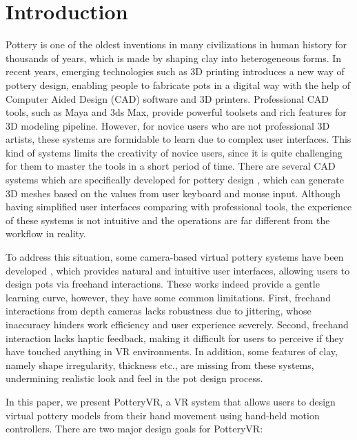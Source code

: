 \section{Introduction}
\label{sec:1}
Pottery is one of the oldest inventions in many civilizations in human history for thousands of years, which is made by shaping clay into heterogeneous forms.
In recent years, emerging technologies such as 3D printing introduces a new way of pottery design, enabling people to fabricate pots in a digital way with the help of Computer Aided Design (CAD) software and 3D printers.
Professional CAD tools, such as Maya\cite{website:maya} and 3ds Max\cite{website:3dmax}, provide powerful toolsets and rich features for 3D modeling pipeline.
However, for novice users who are not professional 3D artists, these systems are formidable to learn due to complex user interfaces. 
This kind of systems limits the creativity of novice users, since it is quite challenging for them to master the tools in a short period of time.
There are several CAD systems which are specifically developed for pottery design \cite{koutsoudis2009qp,kumar2011wheel}, which can generate 3D meshes based on the values from user keyboard and mouse input. Although having simplified user interfaces comparing with professional tools, the experience of these systems is not intuitive and the operations are far different from the workflow in reality.

To address this situation, some camera-based virtual pottery systems have been developed \cite{ramani2015gesture,murugappan2013handy,han2014virtual}, which provides natural and intuitive user interfaces, allowing users to design pots via freehand interactions.
These works indeed provide a gentle learning curve, however, they have some common limitations.
First, freehand interactions from depth cameras lacks robustness due to jittering, whose inaccuracy hinders work efficiency and user experience severely.
Second, freehand interaction lacks haptic feedback, making it difficult for users to perceive if they have touched anything in VR environments.
In addition, some features of clay, namely shape irregularity, thickness etc., are missing from these systems, undermining realistic look and feel in the pot design process.

In this paper, we present PotteryVR, a VR system that allows users to design virtual pottery models from their hand movement using hand-held motion controllers. There are two major design goals for PotteryVR:

